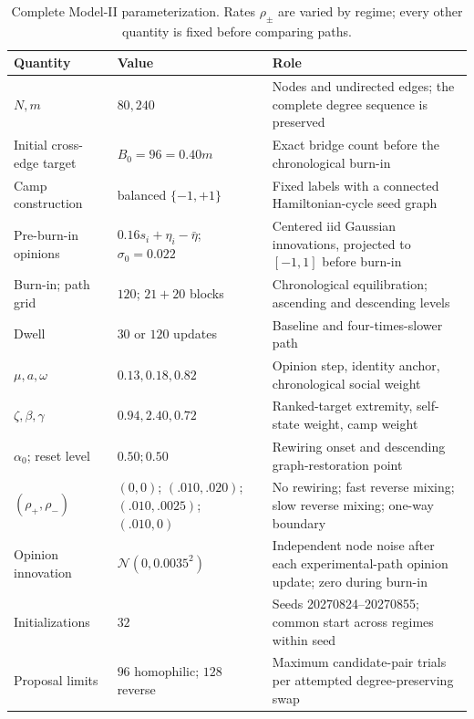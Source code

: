 \documentclass[10pt,a4paper]{article}
\begin{document}
\begin{table}[!htbp]
\centering
\caption{Complete Model-II parameterization. Rates $\rho_\pm$ are varied by regime; every other quantity is fixed before comparing paths.}
\label{tab:model-ii-parameters}
\small
\begin{tabularx}{\textwidth}{|p{2.6cm}|p{2.0cm}|Y|}
\hline
\textbf{Quantity} & \textbf{Value} & \textbf{Role}\\
\hline
$N,m$ & $80,240$ & Nodes and undirected edges; the complete degree sequence is preserved\\
\hline
Initial cross-edge target & $B_0=96=0.40m$ & Exact bridge count before the chronological burn-in\\
\hline
Camp construction & balanced $\{-1,+1\}$ & Fixed labels with a connected Hamiltonian-cycle seed graph\\
\hline
Pre-burn-in opinions & $0.16s_i+\eta_i-\bar\eta$; $\sigma_0=0.022$ & Centered iid Gaussian innovations, projected to $[-1,1]$ before burn-in\\
\hline
Burn-in; path grid & $120$; $21+20$ blocks & Chronological equilibration; ascending and descending levels\\
\hline
Dwell & $30$ or $120$ updates & Baseline and four-times-slower path\\
\hline
$\mu,a,\omega$ & $0.13,0.18,0.82$ & Opinion step, identity anchor, chronological social weight\\
\hline
$\zeta,\beta,\gamma$ & $0.94,2.40,0.72$ & Ranked-target extremity, self-state weight, camp weight\\
\hline
$\alpha_0$; reset level & $0.50;0.50$ & Rewiring onset and descending graph-restoration point\\
\hline
$(\rho_+,\rho_-)$ & $(0,0)$; $(.010,.020)$; $(.010,.0025)$; $(.010,0)$ & No rewiring; fast reverse mixing; slow reverse mixing; one-way boundary\\
\hline
Opinion innovation & $\mathcal N(0,0.0035^2)$ & Independent node noise after each experimental-path opinion update; zero during burn-in\\
\hline
Initializations & $32$ & Seeds 20270824--20270855; common start across regimes within seed\\
\hline
Proposal limits & $96$ homophilic; $128$ reverse & Maximum candidate-pair trials per attempted degree-preserving swap\\
\hline
\end{tabularx}
\end{table}
\end{document}
